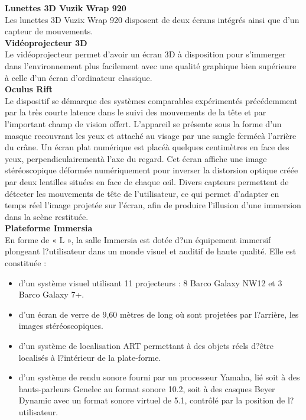 \textbf{Lunettes 3D Vuzik Wrap 920}
\\

Les lunettes 3D Vuzix Wrap 920 disposent de deux \'ecrans int\'egr\'es ainsi que d'un capteur de mouvements.
\\

\textbf{Vid\'eoprojecteur 3D}
\\

Le vid\'eoprojecteur permet d'avoir un \'ecran 3D \`a disposition pour s'immerger dans l'environnement plus facilement avec une qualit\'e graphique bien sup\'erieure \`a celle d'un \'ecran d'ordinateur classique.
\\


\textbf{Oculus Rift}
\\

Le dispositif se d\'emarque des syst\`emes comparables exp\'eriment\'es pr\'ec\'edemment par la tr\`es courte latence dans le suivi des mouvements de la t\^ete et par l'important champ de vision offert. L'appareil se pr\'esente sous la forme d'un masque recouvrant les yeux et attach\'e au visage par une sangle ferm\'ee\`a l'arri\`ere du cr\^ane. Un \'ecran plat num\'erique est plac\'e\`a quelques centim\`etres en face des yeux, perpendiculairement\`a l'axe du regard. Cet \'ecran affiche une image st\'er\'eoscopique d\'eform\'ee num\'eriquement pour inverser la distorsion optique cr\'e\'ee par deux lentilles situ\'ees en face de chaque œil. Divers capteurs permettent de d\'etecter les mouvements de t\^ete de l'utilisateur, ce qui permet d'adapter en temps r\'eel l'image projet\'ee sur l'\'ecran, afin de produire l'illusion d'une immersion dans la sc\`ene restitu\'ee.
\\

\textbf{Plateforme Immersia}
\\

En forme de « L », la salle Immersia est dot\'ee d?un \'equipement immersif plongeant l?utilisateur dans un monde visuel et auditif de haute qualit\'e. 
Elle est constitu\'ee  :
\begin{itemize}
  \item d'un syst\`eme visuel utilisant 11 projecteurs : 8 Barco Galaxy NW12 et 3 Barco Galaxy 7+.
  \item d'un \'ecran de verre de 9,60 m\`etres de long o\`u sont projet\'ees par l?arri\`ere, les images st\'er\'eoscopiques.
  \item d'un syst\`eme de localisation ART permettant \`a des objets r\'eels d?\^etre localis\'es \`a l?int\'erieur de la plate-forme.
  \item d'un syst\`eme de rendu sonore fourni par un processeur Yamaha, li\'e soit \`a des hauts-parleurs Genelec au format sonore 10.2, soit \`a des casques Beyer Dynamic avec un format sonore virtuel de 5.1, contrôl\'e par la position de l?utilisateur.
\end{itemize}

